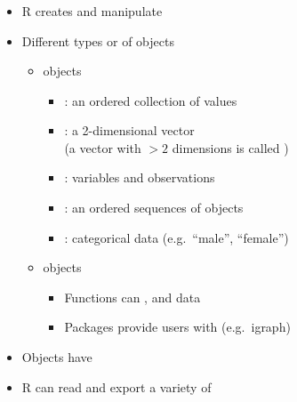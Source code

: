 \documentclass[8pt]{beamer}
\begin{document}
\begin{frame}
\frametitle{\insertsection}

\begin{itemize}

\item R creates and manipulate {\color{blue}{objects}}

\medskip

\item Different types or {\color{blue}{classes}} of objects
    \begin{itemize}
    
    \medskip
    
    \item {\color{blue}{Data}} objects 
    	\begin{itemize}
		\item {\color{blue}{vector}}: an ordered collection of values
		\item {\color{blue}{matrix}}: a 2-dimensional vector \\(a vector with $>2$ dimensions is called {\color{blue}{array}})
		\item {\color{blue}{data frame}}: variables and observations
		\item {\color{blue}{list}}: an ordered sequences of objects
		\item {\color{blue}{factor}}: categorical data (e.g.\ ``male'', ``female'')
		\end{itemize}
       
    \medskip
      	  
    \item {\color{blue}{Function}} objects
    		\begin{itemize}
			\item Functions can {\color{blue}{read}}, {\color{blue}{manipulate}} and {\color{blue}{analyse}} data
			\item Packages provide users with {\color{blue}{additional functions}} (e.g.\ igraph)
			\end{itemize}
			
    \end{itemize}

\medskip

\item Objects have {\color{blue}{attributes}}

\item R can read and export a variety of {\color{blue}{data formats}}
\end{itemize}


\end{frame}
\end{document}
